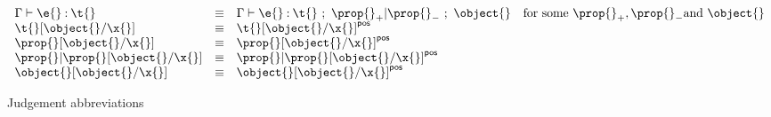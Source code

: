 \begin{figure*}
$$
\begin{array}{lllr}
  \judgementtwo{\propenv{}}{\hastype{\e{}}{\t{}}} &\equiv& 
  \judgement{\propenv{}}{\hastype{\e{}}{\t{}}}{\filterset{\thenprop{\prop{}}}{\elseprop{\prop{}}}}{\object{}}
  & \text{for some}\ {\thenprop{\prop{}}}, {\elseprop{\prop{}}} \text{and}\ {\object{}}

  \\
  {\replacefor{\t{}}{\object{}}{\x{}}} &\equiv& {\pluspolarity{\replacefor{\t{}}{\object{}}{\x{}}}}
  \\
  {\replacefor{\prop{}}{\object{}}{\x{}}} &\equiv&  {\pluspolarity{\replacefor{\prop{}}{\object{}}{\x{}}}}
  \\
  {\replacefor{\filterset{\prop{}}{\prop{}}}{\object{}}{\x{}}} &\equiv&  {\pluspolarity{\replacefor{\filterset{\prop{}}{\prop{}}}{\object{}}{\x{}}}}
  \\
  {\replacefor{\object{}}{\object{}}{\x{}}} &\equiv& {\pluspolarity{\replacefor{\object{}}{\object{}}{\x{}}}}

\end{array}
$$
\caption{Judgement abbreviations}
\end{figure*}
